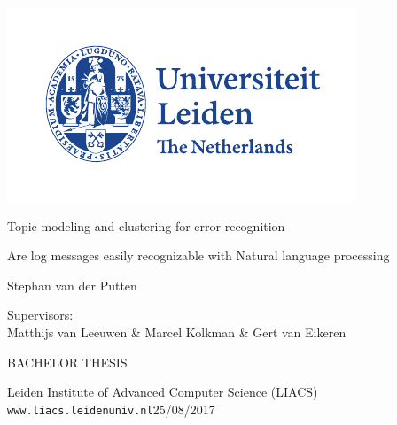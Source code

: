 \thispagestyle{empty}

\includegraphics{logoleiden}


\vspace{-2.5cm}\hfill {}

\vspace{5cm}
\begin{Large}
\hfill Topic modeling and clustering for error recognition 

\vspace*{3mm}

\hfill Are log messages easily recognizable with Natural language processing

\vspace*{14mm}

\hfill Stephan van der Putten
\end{Large}

\vspace*{4.5cm}

\begin{large}

Supervisors:\\
Matthijs van Leeuwen \& Marcel Kolkman \& Gert van Eikeren


\vspace*{2.8cm}
BACHELOR THESIS

\vspace*{5mm}
Leiden Institute of Advanced Computer Science (LIACS)\\
\texttt{www.liacs.leidenuniv.nl}\hfill 25/08/2017
\end{large}

